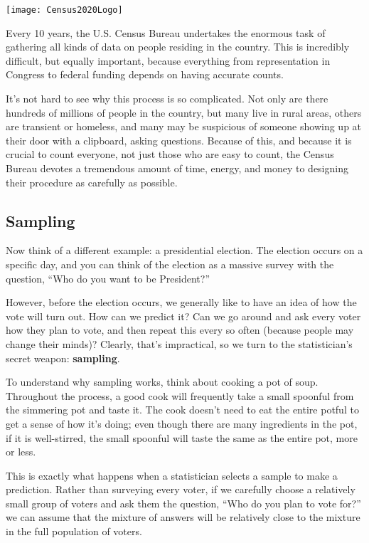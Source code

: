 \setcounter{ExampleCounter}{1}
\begin{center}
\texttt{[image: Census2020Logo]}
\end{center}
Every 10 years, the U.S. Census Bureau undertakes the enormous task of gathering all kinds of data on people residing in the country.  This is incredibly difficult, but equally important, because everything from representation in Congress to federal funding depends on having accurate counts.

It's not hard to see why this process is so complicated.  Not only are there hundreds of millions of people in the country, but many live in rural areas, others are transient or homeless, and many may be suspicious of someone showing up at their door with a clipboard, asking questions.  Because of this, and because it is crucial to count everyone, not just those who are easy to count, the Census Bureau devotes a tremendous amount of time, energy, and money to designing their procedure as carefully as possible.

\subsection{Sampling}
Now think of a different example: a presidential election.  The election occurs on a specific day, and you can think of the election as a massive survey with the question, ``Who do you want to be President?''

However, before the election occurs, we generally like to have an idea of how the vote will turn out.  How can we predict it?  Can we go around and ask every voter how they plan to vote, and then repeat this every so often (because people may change their minds)?  Clearly, that's impractical, so we turn to the statistician's secret weapon: \textbf{sampling}.

To understand why sampling works, think about cooking a pot of soup.  Throughout the process, a good cook will frequently take a small spoonful from the simmering pot and taste it.  The cook doesn't need to eat the entire potful to get a sense of how it's doing; even though there are many ingredients in the pot, if it is well-stirred, the small spoonful will taste the same as the entire pot, more or less.

This is exactly what happens when a statistician selects a sample to make a prediction.  Rather than surveying every voter, if we carefully choose a relatively small group of voters and ask them the question, ``Who do you plan to vote for?'' we can assume that the mixture of answers will be relatively close to the mixture in the full population of voters.

